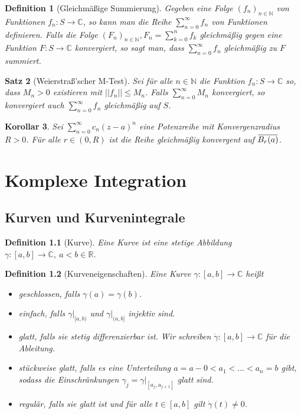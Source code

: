 \documentclass[a4paper,12pt]{book}
\theoremstyle{newthm}
\newtheorem{thm}{Satz}[section]
\newtheorem{cor}[thm]{Korollar}
\theoremstyle{newdef}
\newtheorem{defn}[thm]{Definition}
\theoremstyle{newrem}
\newcommand{\N}{\mathbb{N}}
\newcommand{\R}{\mathbb{R}}
\newcommand{\C}{\mathbb{C}}
\newcommand{\bound}[2]{\left.#1\right|_{#2}}
\newcommand{\overbar}[1]{\mkern 1.5mu\overline{\mkern-1.5mu#1\mkern-1.5mu}\mkern 1.5mu}
\begin{document}
		\begin{defn}[Gleichmäßige Summierung]
			Gegeben eine Folge $ (f_n)_{n \in \N} $ von Funktionen $ f_n: S \to \C $, so kann man die Reihe $ \sum\limits_{n=0}^\infty f_n $ von Funktionen definieren. Falls die Folge $ (F_n)_{n \in \N}, F_n = \sum\limits_{k=0}^n f_k $ gleichmäßig gegen eine Funktion $ F: S \to \C $ konvergiert, so sagt man, dass $ \sum\limits_{n=0}^\infty f_n $ \emph{gleichmäßig zu $F$ summiert}.
		\end{defn}
		
		\begin{thm}[Weierstraß'scher M-Test]
			Sei für alle $ n \in \N $ die Funktion $ f_n:S \to \C $ so, dass $ M_n > 0 $ existieren mit $ ||f_n|| \leq M_n $. Falls $ \sum\limits_{n=0}^\infty M_n $ konvergiert, so konvergiert auch $ \sum\limits_{n=0}^\infty f_n $ gleichmäßig auf $S$.
		\end{thm}
		
		\begin{cor}
			Sei $ \sum\limits_{n=0}^\infty c_n (z-a)^n $ eine Potenzreihe mit Konvergenzradius $ R > 0 $. Für alle $ r \in (0,R) $ ist die Reihe gleichmäßig konvergent auf $ \overbar{B_r(a)} $.
		\end{cor}
		
	
	
	
	
	
\chapter{Komplexe Integration}
	
	\section{Kurven und Kurvenintegrale}
		
		\begin{defn}[Kurve]
			Eine \emph{Kurve} ist eine stetige Abbildung $ \gamma: [a,b] \to \C,\ a<b\in \R $.
		\end{defn}
		
		\begin{defn}[Kurveneigenschaften]
			Eine Kurve $ \gamma: [a,b] \to \C $ heißt
			\begin{itemize}
				\item \emph{geschlossen}, falls $ \gamma(a) = \gamma(b) $.
				\item \emph{einfach}, falls $ \bound{\gamma}{[a,b)} $ und $ \bound{\gamma}{(a,b]} $ injektiv sind.
				\item \emph{glatt}, falls sie stetig differenzierbar ist. Wir schreiben $ \dot{\gamma} : [a,b] \to \C $ für die Ableitung.
				\item \emph{stückweise glatt}, falls es eine Unterteilung $ a = a-0 < a_1 < \dots < a_n=b $ gibt, sodass die Einschränkungen $ \gamma_j = \bound{\gamma}{\left[a_j,a_{j+1}\right]} $ glatt sind.
				\item \emph{regulär}, falls sie glatt ist und für alle $ t \in [a,b] $ gilt $ \dot{\gamma}(t) \neq 0 $.
			\end{itemize}
		\end{defn}
		
\end{document}

